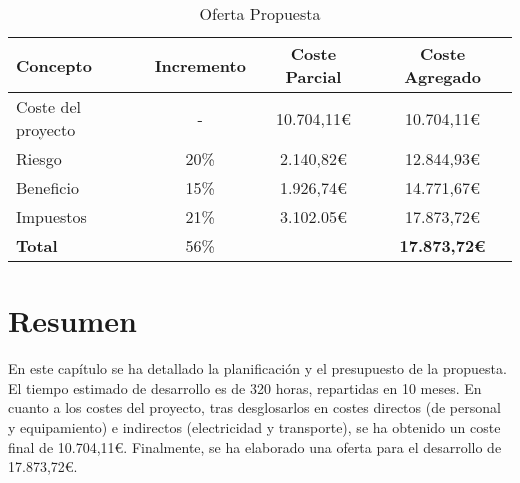 \begin{table}[H]
    \begin{tabular}{@{}lccc@{}}
        \toprule
        \textbf{Concepto} & \textbf{Incremento} & \textbf{Coste Parcial} & \textbf{Coste} \textbf{Agregado}\\
        \midrule
        Coste del proyecto & -    & 10.704,11\euro & 10.704,11\euro \\
        Riesgo             & 20\% &  2.140,82\euro & 12.844,93\euro \\
        Beneficio          & 15\% &  1.926,74\euro & 14.771,67\euro \\
        Impuestos          & 21\% &  3.102.05\euro & 17.873,72\euro\\
        \midrule
        \textbf{Total}     & 56\% &        & \textbf{17.873,72\euro}\\
        \bottomrule
    \end{tabular}
    \caption{Oferta Propuesta}\label{tab:offer}
\end{table}

\section{Resumen}

En este capítulo se ha detallado la planificación y el presupuesto de la propuesta. El tiempo estimado de desarrollo es de 320 horas, repartidas en 10 meses. En cuanto a los costes del proyecto, tras desglosarlos en costes directos (de personal y equipamiento) e indirectos (electricidad y transporte), se ha obtenido un coste final de 10.704,11\euro. Finalmente, se ha elaborado una oferta para el desarrollo de 17.873,72\euro.
